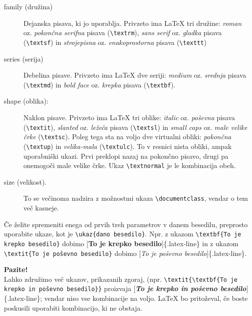 \begin{description}
\item[family (družina)] Dejanska pisava, ki jo uporablja. Privzeto ima LaTeX tri družine: \textit{roman} oz. \textit{pokončna serifna} pisava (\texttt{{\textbackslash}textrm}), \textit{sans serif} oz. \textit{gladka} pisava (\texttt{{\textbackslash}textsf})  in \textit{strojepisna} oz. \textit{enakoprostorna} pisava  (\texttt{{\textbackslash}texttt})
\item[series (serija)] Debelina pisave. Privzeto ima LaTeX dve seriji: \textit{medium} oz. \textit{srednja} pisava (\texttt{{\textbackslash}textmd}) in \textit{bold face} oz. \textit{krepka} pisava (\texttt{{\textbackslash}textbf}).
\item[shape (oblika):] Naklon pisave. Privzeto ima LaTeX tri oblike: \textit{italic} oz. \textit{poševna} pisava (\texttt{{\textbackslash}textit}),   \textit{slanted} oz.  \textit{ležeča} pisava (\texttt{{\textbackslash}textsl}) in  \textit{small caps} oz. \textit{male velike črke} (\texttt{{\textbackslash}textsc}).
Poleg tega sta na voljo dve virtualni obliki: \textit{pokončna} (\texttt{{\textbackslash}textup}) in \textit{velika-mala} (\texttt{{\textbackslash}textulc}). To v resnici nista obliki, ampak uporabniški
ukazi. Prvi preklopi nazaj na pokončno pisavo, drugi pa onemogoči
male velike črke. Ukaz \texttt{{\textbackslash}textnormal} je le
kombinacija obeh.
\item[size (velikost).] To se večinoma nadzira z možnostmi ukaza \texttt{{\textbackslash}documentclass}, vendar o tem več kasneje.
\end{description}

Če želite spremeniti enega od prvih treh parametrov v danem besedilu, preprosto uporabite ukaze, kot je \texttt{{\textbackslash}ukaz\{dano besedilo\}}. Npr. z ukazom \texttt{{\textbackslash}textbf\{To je krepko besedilo\}} dobimo [\textbf{To je krepko besedilo}]\{.latex-line\} in z ukazom \texttt{{\textbackslash}textit\{To je poševno besedilo\}} dobimo [\textit{To je poševno besedilo}]\{.latex-line\}.

\begin{framed}
\textbf{Pazite!}\\
Lahko združimo več ukazov, prikazanih zgoraj, (npr. \texttt{{\textbackslash}textit\{{\textbackslash}textbf\{To je krepko in poševno besedilo\}\}} proizvaja [\textbf{\textit{To je krepko in poševno besedilo}}]\{.latex-line\}; vendar niso vse kombinacije na voljo. LaTeX bo pritoževal, če boste poskusili uporabiti kombinacijo, ki ne obstaja.
\end{framed}

